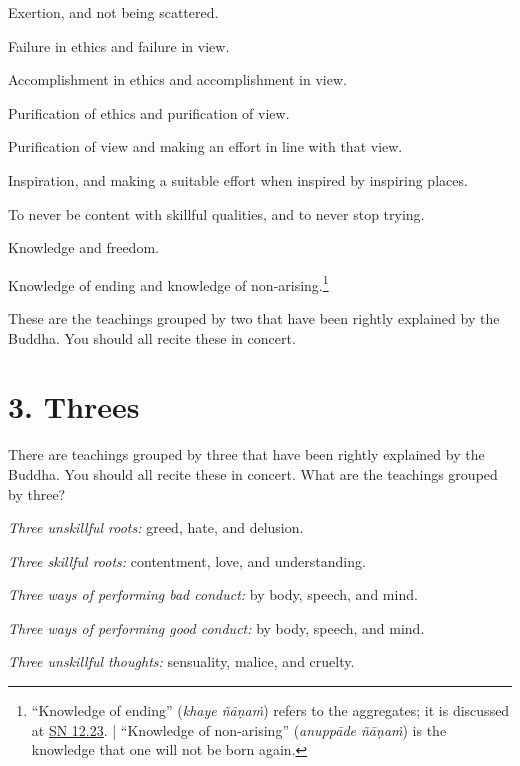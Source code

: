 \documentclass[12pt,openany]{book}%
\begin{document}
Exertion, and not being scattered. 

Failure in ethics and failure in view. 

Accomplishment in ethics and accomplishment in view. 

Purification of ethics and purification of view. 

Purification of view and making an effort in line with that view. 

Inspiration, and making a suitable effort when inspired by inspiring places. 

To never be content with skillful qualities, and to never stop trying. 

Knowledge and freedom. 

Knowledge of ending and knowledge of non-arising.\footnote{“Knowledge of ending” (\textit{khaye \textsanskrit{ñāṇaṁ}}) refers to the aggregates; it is discussed at \href{https://suttacentral.net/sn12.23/en/sujato}{SN 12.23}. | “Knowledge of non-arising” (\textit{\textsanskrit{anuppāde} \textsanskrit{ñāṇaṁ}}) is the knowledge that one will not be born again. } 

These are the teachings grouped by two that have been rightly explained by the Buddha. You should all recite these in concert. 

\section*{3. Threes }

There are teachings grouped by three that have been rightly explained by the Buddha. You should all recite these in concert. What are the teachings grouped by three? 

\emph{Three unskillful roots:} greed, hate, and delusion. 

\emph{Three skillful roots:} contentment, love, and understanding. 

\emph{Three ways of performing bad conduct:} by body, speech, and mind. 

\emph{Three ways of performing good conduct:} by body, speech, and mind. 

\emph{Three unskillful thoughts:} sensuality, malice, and cruelty. 
\end{document}
